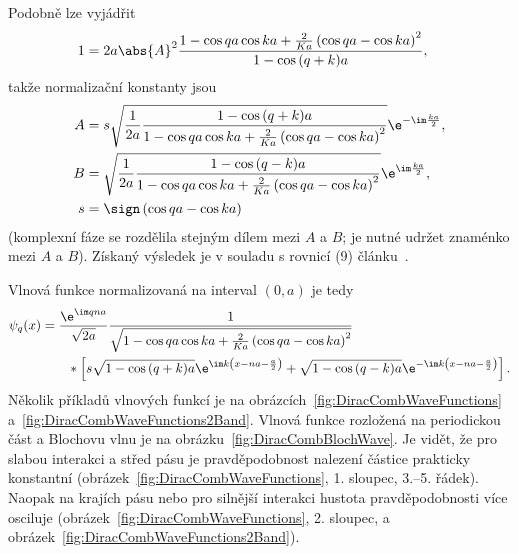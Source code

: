 \begin{solution}
\begin{enumerate}
        Podobně lze vyjádřit
        \begin{align}
            1&=2a\abs{A}^{2}\frac{1-\cos{qa}\cos{ka}+\frac{2}{Ka}\left(\cos{qa}-\cos{ka}\right)^{2}}{1-\cos{(q+k)a}},
        \end{align}
        takže normalizační konstanty jsou
        \begin{subequations}
            \begin{align}
                A&=s\sqrt{\frac{1}{2a}\frac{1-\cos{(q+k)a}}{1-\cos{qa}\cos{ka}+\frac{2}{Ka}\left(\cos{qa}-\cos{ka}\right)^{2}}}\e^{-\im\frac{ka}{2}},\\
                B&=\sqrt{\frac{1}{2a}\frac{1-\cos{(q-k)a}}{1-\cos{qa}\cos{ka}+\frac{2}{Ka}\left(\cos{qa}-\cos{ka}\right)^{2}}}\e^{\im\frac{ka}{2}},\\
                s&=\sign\left(\cos{qa}-\cos{ka}\right)
            \end{align}
        \end{subequations}
        (komplexní fáze se rozdělila stejným dílem mezi $A$ a $B$; je nutné udržet znaménko mezi $A$ a $B$).
        Získaný výsledek je v souladu s rovnicí (9) článku~\cite{Kronig1931}.
        
        Vlnová funkce normalizovaná na interval $(0,a)$ je tedy
        \begin{align}
            \psi_{q}(x)
                &=\frac{\e^{\im qna}}{\sqrt{2a}}\frac{1}{\sqrt{1-\cos{qa}\cos{ka}+\frac{2}{Ka}\left(\cos{qa}-\cos{ka}\right)^{2}}}\\
                &\qquad*\left[s\sqrt{1-\cos{(q+k)a}}\e^{\im k\left(x-na-\frac{a}{2}\right)}+\sqrt{1-\cos{(q-k)a}}\e^{-\im k\left(x-na-\frac{a}{2}\right)}\right].\nonumber
        \end{align}
        Několik příkladů vlnových funkcí je na obrázcích~\ref{fig:DiracCombWaveFunctions} a~\ref{fig:DiracCombWaveFunctions2Band}.
        Vlnová funkce rozložená na periodickou část a Blochovu vlnu je na obrázku~\ref{fig:DiracCombBlochWave}.
        Je vidět, že pro slabou interakci a střed pásu je pravděpodobnost nalezení částice prakticky konstantní (obrázek~\ref{fig:DiracCombWaveFunctions}, 1. sloupec, 3.--5. řádek).
        Naopak na krajích pásu nebo pro silnější interakci hustota pravděpodobnosti více osciluje (obrázek~\ref{fig:DiracCombWaveFunctions}, 2. sloupec, a obrázek~\ref{fig:DiracCombWaveFunctions2Band}).


\end{enumerate}
\end{solution}
